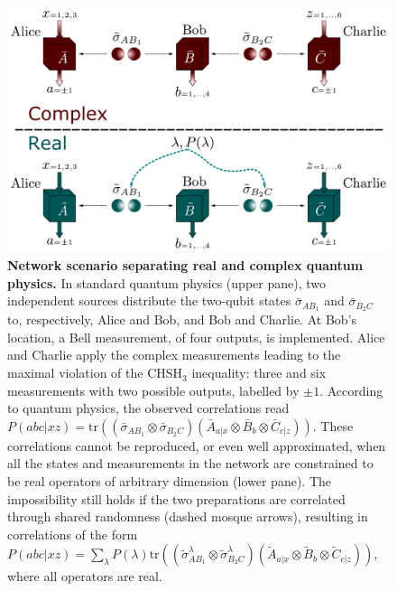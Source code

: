 \documentclass[onecolumn,prx,amsmath,amssymb]{revtex4-2}
\def\tr{\mbox{tr}}
\begin{document}
\begin{figure}
  \centering
  \includegraphics[width=15cm]{network.pdf}
  \caption{\textbf{Network scenario separating real and complex quantum physics.} In standard quantum physics (upper pane), two independent sources distribute the two-qubit states $\bar\sigma_{AB_1}$ and $\bar\sigma_{B_2C}$ to, respectively, Alice and Bob, and Bob and Charlie. At Bob's location, a Bell measurement, of four outputs, is implemented. Alice and Charlie apply the complex measurements leading to the maximal violation of the $\text{CHSH}_3$ inequality: three and six measurements with two possible outputs, labelled by $\pm 1$. According to quantum physics, the observed correlations read $P(abc|xz)=\tr\left((\bar{\sigma}_{AB_1}\otimes\bar{\sigma}_{B_2C})(\bar{A}_{a|x}\otimes\bar{B}_{b}\otimes\bar{C}_{c|z})\right)$. These correlations cannot be reproduced, or even well approximated, when all the states and measurements in the network are constrained to be real operators of arbitrary dimension (lower pane). The impossibility still holds if the two preparations are correlated through shared randomness (dashed mosque arrows), resulting in correlations of the form $P(abc|xz)=\sum_\lambda P(\lambda)\tr\left((\tilde\sigma_{AB_1}^\lambda\otimes\tilde\sigma_{B_2C}^\lambda)(\tilde{A}_{a|x}\otimes\tilde{B}_{b}\otimes\tilde{C}_{c|z})\right)$, where all operators are real.}
  \label{fig:entswap}
\end{figure}
\end{document}
